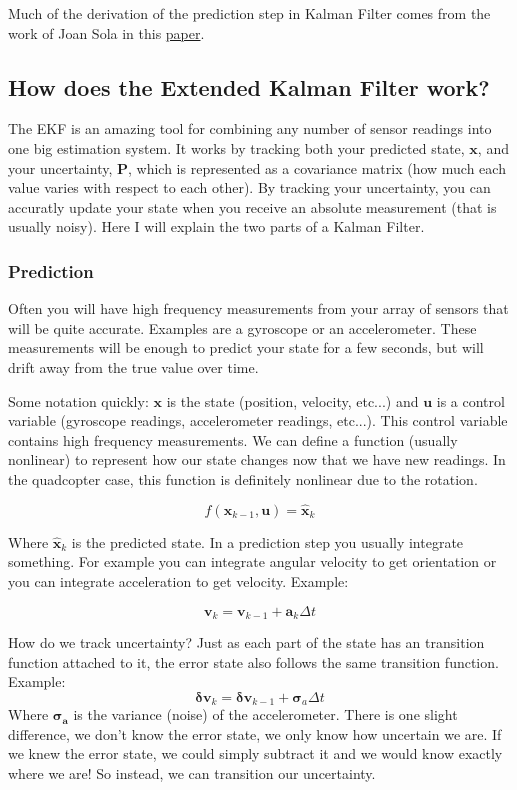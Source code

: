 \documentclass[11pt]{article}
\renewcommand{\vec}[1]{\mathbf{#1}}
\renewcommand{\tilde}[1]{\expandafter\hat{#1}}
\newcommand{\mat}[1]{\mathbf{#1}}
\begin{document}
Much of the derivation of the prediction step in Kalman Filter comes from the work of Joan Sola in this \href{http://www.iri.upc.edu/people/jsola/JoanSola/objectes/notes/kinematics.pdf}{paper}.
\subsection{How does the Extended Kalman Filter work?}
The EKF is an amazing tool for combining any number of sensor readings into one big estimation system. It works by tracking both your predicted state, $\vec{x}$, and your uncertainty, $\mat{P}$, which is represented as a covariance matrix (how much each value varies with respect to each other). By tracking your uncertainty, you can accuratly update your state when you receive an absolute measurement (that is usually noisy). Here I will explain the two parts of a Kalman Filter.
\subsubsection{Prediction}
	Often you will have high frequency measurements from your array of sensors that will be quite accurate. Examples are a gyroscope or an accelerometer. These measurements will be enough to predict your state for a few seconds, but will drift away from the true value over time.
	
Some notation quickly: $\vec{x}$ is the state (position, velocity, etc...) and $\vec{u}$ is a control variable (gyroscope readings, accelerometer readings, etc...). This control variable contains high frequency measurements. We can define a function (usually nonlinear) to represent how our state changes now that we have new readings. In the quadcopter case, this function is definitely nonlinear due to the rotation.

$$f(\vec{x}_{k-1}, \vec{u}) = \vec{\tilde{x}}_k$$

Where $\vec{\tilde{x}}_k$ is the predicted state. In a prediction step you usually integrate something. For example you can integrate angular velocity to get orientation or you can integrate acceleration to get velocity. Example:

$$\vec{v}_{k} = \vec{v}_{k-1} + \vec{a}_k\Delta t$$

How do we track uncertainty? Just as each part of the state has an transition function attached to it, the error state also follows the same transition function. Example:
$$\vec{\delta v}_k = \vec{\delta v}_{k-1} + \vec{\sigma}_a\Delta t$$
Where $\vec{\sigma_a}$ is the variance (noise) of the accelerometer. There is one slight difference, we don't know the error state, we only know how uncertain we are. If we knew the error state, we could simply subtract it and we would know exactly where we are! So instead, we can transition our uncertainty.
\end{document}
